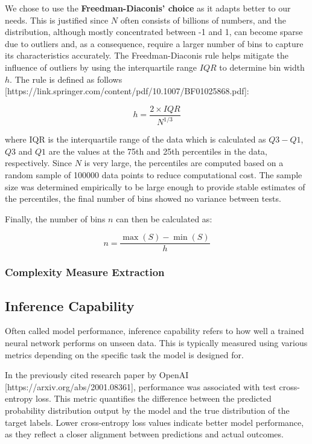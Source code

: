         We chose to use the \textbf{Freedman-Diaconis' choice} as it adapts better to our needs. This is justified since \( N \) often consists of billions of numbers, and the distribution, although mostly concentrated between -1 and 1, can become sparse due to outliers and, as a consequence, require a larger number of bins to capture its characteristics accurately. The Freedman-Diaconis rule helps mitigate the influence of outliers by using the interquartile range \( IQR \) to determine bin width \( h \). The rule is defined as follows [https://link.springer.com/content/pdf/10.1007/BF01025868.pdf]:

        \[ h = \frac{2 \times IQR}{N^{1/3}} \]

        where IQR is the interquartile range of the data which is calculated as \( Q3 - Q1 \), \( Q3 \) and \( Q1 \) are the values at the 75th and 25th percentiles in the data, respectively. Since \( N \) is very large, the percentiles are computed based on a random sample of 100000 data points to reduce computational cost. The sample size was determined empirically to be large enough to provide stable estimates of the percentiles, the final number of bins showed no variance between tests.

        Finally, the number of bins \( n \) can then be calculated as:

        \[ n = \frac{\max(S) - \min(S)}{h} \]

    \subsubsection{Complexity Measure Extraction}

\subsection{Inference Capability}

    Often called model performance, inference capability refers to how well a trained neural network performs on unseen data. This is typically measured using various metrics depending on the specific task the model is designed for. 
    
    In the previously cited research paper by OpenAI [https://arxiv.org/abs/2001.08361], performance was associated with test cross-entropy loss. This metric quantifies the difference between the predicted probability distribution output by the model and the true distribution of the target labels. Lower cross-entropy loss values indicate better model performance, as they reflect a closer alignment between predictions and actual outcomes.


